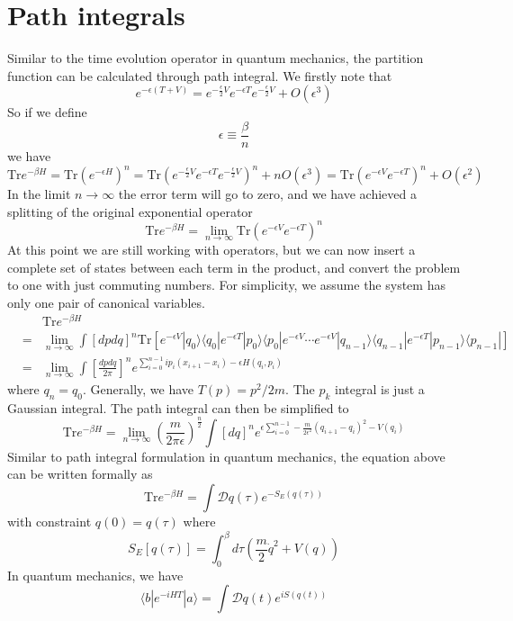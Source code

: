 \section{Path integrals}
Similar to the time evolution operator in quantum mechanics, the partition function can be calculated through path integral. We firstly note that
\[e^{-\epsilon(T+V)} = e^{-\frac{\epsilon}{2} V}e^{-\epsilon T} e^{-\frac{\epsilon}{2} V} + O(\epsilon^3)\]
So if we define
\[\epsilon \equiv \frac{\beta}{n}\]
we have
\[\mathrm{Tr}e^{-\beta H} = \mathrm{Tr} \left( e^{-\epsilon H} \right)^n = \mathrm{Tr} \left(e^{-\frac{\epsilon}{2} V}e^{-\epsilon T} e^{-\frac{\epsilon}{2} V}\right)^n + nO(\epsilon^3) = \mathrm{Tr} \left(e^{-\epsilon V}e^{-\epsilon T} \right)^n + O(\epsilon^2)\]
In the limit $n \to \infty$ the error term will go to zero, and we have achieved a splitting of the original exponential operator
\[\mathrm{Tr}e^{-\beta H} = \lim_{n \to \infty} \mathrm{Tr} \left(e^{-\epsilon V}e^{-\epsilon T} \right)^n\]
At this point we are still working with operators, but we can now insert a complete set of states between each term in the product, and convert the problem to one with just commuting numbers. For simplicity, we assume the system has only one pair of canonical variables.
\begin{eqnarray}
&\phantom{=}& \mathrm{Tr}e^{-\beta H} \nonumber \\
&=& \lim_{n \to \infty} \int [dpdq]^n  \mathrm{Tr} [ e^{-\epsilon V}|q_0\rangle \langle q_0 | e^{-\epsilon T} |p_0 \rangle\langle p_0| e^{-\epsilon V} \cdots e^{-\epsilon V} |q_{n-1}\rangle\langle q_{n-1}| e^{-\epsilon T} |p_{n-1}\rangle\langle p_{n-1} | ] \nonumber \\
&=& \lim_{n \to \infty} \int [\frac{dpdq}{2\pi}]^n e^{\sum_{i=0}^{n-1}ip_i(x_{i+1}-x_i) - \epsilon H(q_i,p_i)} \nonumber
\end{eqnarray}
where $q_{n} = q_0$. 
Generally, we have $T(p) = p^2/2m$. The $p_k$ integral is just a Gaussian integral. The path integral can then be simplified to
\[\mathrm{Tr}e^{-\beta H} = \lim_{n \to \infty} \left( \frac{m}{2\pi \epsilon} \right)^{\frac{n}{2}} \int [dq]^n e^{\epsilon \sum_{i=0}^{n-1}  -\frac{m}{2\epsilon^2}(q_{i+1}-q_i)^2 -  V(q_i)} \]
Similar to path integral formulation in quantum mechanics, the equation above can be written formally as
\[\mathrm{Tr}e^{-\beta H} = \int \mathcal{D}q(\tau) e^{-S_E(q(\tau))}\]
with constraint $q(0) = q(\tau)$
where
\[S_E[q(\tau)] = \int_0^{\beta} d\tau \left(\frac{m}{2}\dot{q}^2 + V(q) \right)\]
In quantum mechanics, we have
\[\langle b | e^{-iHT} | a \rangle = \int \mathcal{D}q(t) e^{iS(q(t))}\]
